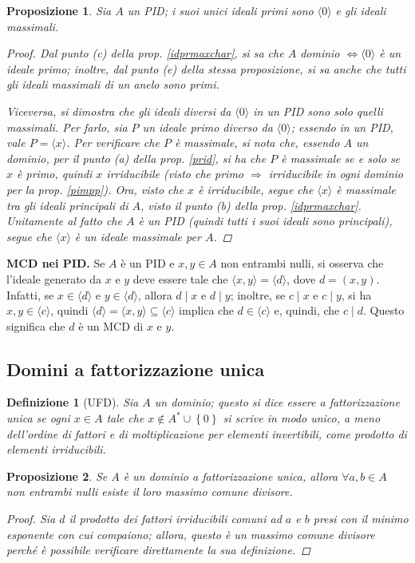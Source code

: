 \documentclass[12pt]{scrartcl}
\theoremstyle{style}
\newtheorem{definizione}{Definizione}[section]
\newtheorem{prop}{Proposizione}[section]
\numberwithin{equation}{subsection}
\renewcommand{\textbf}[1]{\textsf{\bfseries #1}}
\begin{document}
\begin{prop}\label{pideals}
	Sia $A$ un PID; i suoi unici ideali primi sono $\langle 0 \rangle$ e gli ideali massimali.
	\begin{proof}
		Dal punto (c) della prop. \ref{idprmaxchar}, si sa che $A$ dominio $\iff \langle 0 \rangle$ \`e un ideale primo; inoltre, dal punto (e) della stessa proposizione, si sa anche che tutti gli ideali massimali di un anelo sono primi.

		Viceversa, si dimostra che gli ideali diversi da $\langle 0 \rangle $ in un PID sono solo quelli massimali.
		Per farlo, sia $P$ un ideale primo diverso da $\langle 0 \rangle$; essendo  in un PID, vale $P=\langle x \rangle$.
		Per verificare che $P$ \`e massimale, si nota che, essendo $A$ un dominio, per il punto (a) della prop. \ref{prid}, si ha che $P$ \`e massimale se e solo se $x$ \`e primo, quindi $x$ irriducibile (visto che primo $\Rightarrow $ irriducibile in ogni dominio per la prop. \ref{pimpp}).
		Ora, visto che $x$ \`e irriducibile, segue che $\langle x \rangle$ \`e massimale tra gli ideali principali di $A$, visto il punto (b) della prop. \ref{idprmaxchar}.
		Unitamente al fatto che $A$ \`e un PID (quindi tutti i suoi ideali sono principali), segue che $\langle x \rangle$ \`e un ideale massimale per $A$.
	\end{proof}
\end{prop}

\textbf{MCD nei PID.} Se $A$ \`e un PID e $x,y \in A$ non entrambi nulli, si osserva che l'ideale generato da $x$ e $y$ deve essere tale che $\langle x,y \rangle=\langle d \rangle$, dove $d = (x,y)$.
Infatti, se $x \in \langle d \rangle$ e $y \in \langle d \rangle$, allora $d  \mid x $ e $d \mid y$; inoltre, se $c  \mid x $ e $c \mid y$, si ha $x,y \in \langle c \rangle$, quindi $\langle d \rangle=\langle x,y \rangle \subseteq \langle c \rangle$ implica che $d \in \langle c \rangle$ e, quindi, che $c \mid d$.
Questo significa che $d$ \`e un MCD di $x$ e $y$.

\subsection{Domini a fattorizzazione unica}
\begin{definizione}
	[UFD]
	Sia $A$ un dominio; questo si dice essere \textit{a fattorizzazione unica} se ogni $ x \in A$ tale che $x\not\in A^* \cup \left\{ 0 \right\} $ si scrive in modo unico, a meno dell'ordine di fattori e di moltiplicazione per elementi invertibili, come prodotto di elementi irriducibili.
\end{definizione}
\begin{prop}
	Se $A$ \`e un dominio a fattorizzazione unica, allora $\forall a,b \in A$ non entrambi nulli esiste il loro massimo comune divisore.
	\begin{proof}
		Sia $d$ il prodotto dei fattori irriducibili comuni ad $a$ e $b$ presi con il minimo esponente con cui compaiono; allora, questo \`e un massimo comune divisore perch\'e \`e possibile verificare direttamente la sua definizione.
	\end{proof}
\end{prop}
\end{document}
